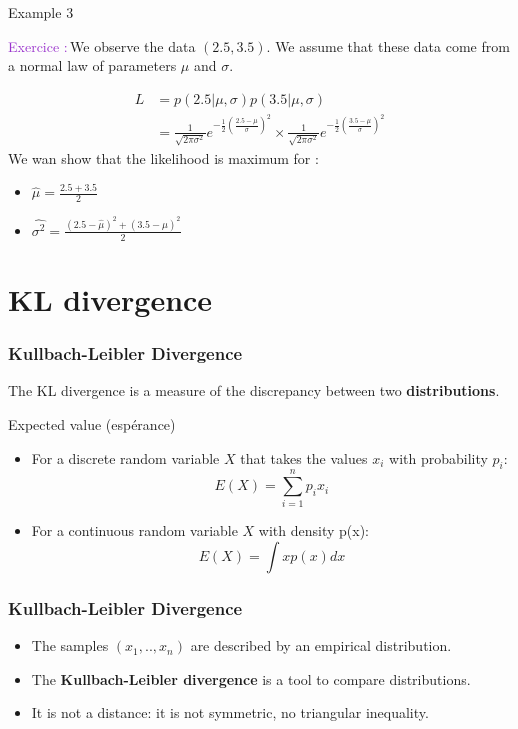 \documentclass[usenames,dvipsnames,french]{beamer}
\newcounter{numexos}%
\newcommand{\exercice}[1]{%
\addtocounter{numexos}{1}%
\textcolor{DarkOrchid}{Exercice\,\thenumexos\,:}\,#1%
}
\begin{document}
\begin{frame}{Example 3}
    \exercice{We observe the data $(2.5, 3.5)$. We assume that these data come from a normal law of parameters $\mu$ and $\sigma$.}
\addtocounter{numexos}{-1}
    \begin{equation}
	\begin{aligned}
	    \label{eq:}
	    L &= p(2.5|\mu, \sigma)p(3.5|\mu,\sigma)\\
	    &= \frac{1}{ \sqrt{2\pi \sigma^2} } e^{ - \frac{1}{2} ( \frac{2.5-\mu}{\sigma}   )^2 }\times \frac{1}{ \sqrt{2\pi \sigma^2}  }e^{ - \frac{1}{2} ( \frac{3.5-\mu}{\sigma}   )^2 }
	\end{aligned}
    \end{equation}
    We wan show that the likelihood is maximum for : 
    \begin{itemize}
	\item $\hat{\mu}= \frac{2.5+3.5}{2} $
	\item $\hat{\sigma^2} = \frac{(2.5-\hat{\mu})^2+(3.5-\hat{\mu})^2}{2} $
    \end{itemize}
\end{frame}

\section{KL divergence}

\begin{frame}
\frametitle{Kullbach-Leibler Divergence}
    The KL divergence is a measure of the discrepancy between two \textbf{distributions}.
\end{frame}


\begin{frame}{Expected value (espérance)}
\begin{itemize}
    \item For a discrete random variable $X$ that takes the values $x_i$ with probability $p_i$: 
    \begin{equation}
        E(X)= \sum^{n}_{i=1} p_ix_i
    \end{equation}
    \item For a continuous random variable $X$ with density p(x): 
    \begin{equation}
        E(X)= \int xp(x)dx
    \end{equation}
\end{itemize} 
\end{frame}


\begin{frame}
\frametitle{Kullbach-Leibler Divergence}
\begin{itemize}
    \item	The samples $(x_1,..,x_n)$ are described by an empirical distribution.
    \item	The \textbf{Kullbach-Leibler divergence} is a tool to compare distributions.
    \item	It is not a distance: it is not symmetric, no triangular inequality.
\end{itemize}
\end{frame}
\end{document}
